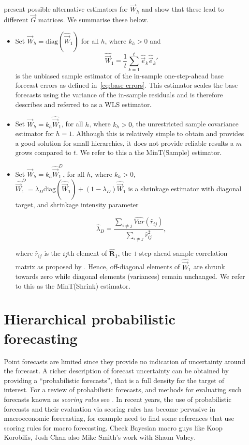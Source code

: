 \documentclass[graybox]{svmult}
\begin{document}
\citet{WicEtAl2019} present possible alternative estimators for ${\vec{W}}_{h}$ and show that these lead to different $\vec{G}$ matrices. We summarise these below.

\begin{itemize}
    \item Set ${\vec{W}}_{h}=\text{diag}(\hat{\vec{W}}_{1})$ for all $h$, where $k_{h} > 0$ and
        $$
        \hat{\vec{W}}_{1} = \frac{1}{t}\sum_{k=1}^{t} \hat{\vec{e}}_{k}\hat{\vec{e}}_{k}'
        $$
        is the unbiased sample estimator of the in-sample one-step-ahead base forecast errors as defined in~\eqref{eq:base errors}. This estimator scales the base forecasts using the variance of the in-sample residuals and is therefore describes and referred to as a WLS estimator.
    \item  Set $\vec{W}_{h}=k_{h}\hat{\vec{W}}_{1}$, for all $h$, where $k_{h} > 0$, the unrestricted sample covariance estimator for $h=1$. Although this is relatively simple to obtain and provides a good solution for small hierarchies, it does not provide reliable results a $m$ grows compared to $t$. We refer to this a the MinT(Sample) estimator.
    \item Set $\vec{W}_{h}=k_{h}\hat{\vec{W}}_{1}^D$, for all $h$, where $k_{h} > 0$, $\hat{\vec{W}}^{D}_{1} = \lambda_{D} \text{diag}(\hat{\vec{W}}_{1}) + (1 - \lambda_{D})\hat{\vec{W}}_{1}$ is a shrinkage estimator with diagonal target, and shrinkage intensity parameter

        $$\hat{\lambda}_{D} = \frac{\sum_{i \ne j}\hat{Var}(\hat{r}_{ij})}{\sum_{i \ne j}\hat{r}_{ij}^2},$$


        where $\hat{r}_{ij}$ is the $ij$th element of $\hat{\bm{R}}_{1}$, the $1$-step-ahead sample correlation matrix as proposed by \citet{Schafer2005}. Hence, off-diagonal elements of $\hat{\vec{W}}_1$ are shrunk towards zero while diagonal elements (variances) remain unchanged. We refer to this as the MinT(Shrink) estimator.
\end{itemize}

\section{Hierarchical probabilistic forecasting}

Point forecasts are limited since they provide no indication of uncertainty around the forecast. A richer description of forecast uncertainty can be obtained by providing a ``probabilistic forecasts'', that is a full density for the target of interest. For a review of probabilistic forecasts, and methods for evaluating such forecasts known as {\em scoring rules} see  \citep{Gneiting2014}. In recent years, the use of probabilistic forecasts and their evaluation via scoring rules has become pervasive in macroeconomic forecasting, for example {\color{red} need to find some references that use scoring rules for macro forecasting.  Check Bayesian macro guys like Koop Korobilis, Josh Chan also Mike Smith's work with Shaun Vahey}.
\end{document}
